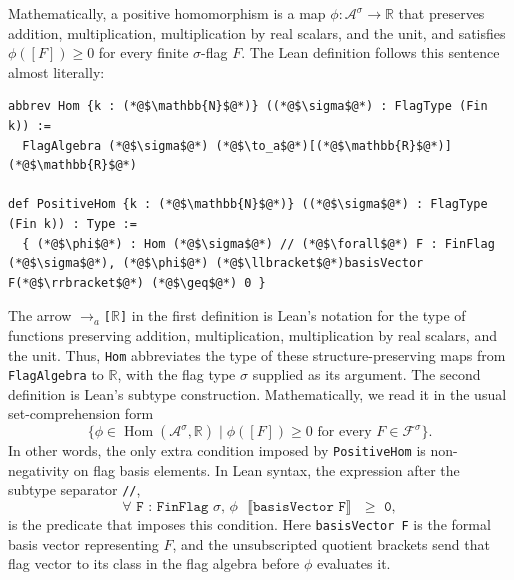 \documentclass{article}
\newcommand{\lean}[1]{\texttt{#1}}
\begin{document}
Mathematically, a positive homomorphism is a map
\(\phi:\mathcal{A}^\sigma\to\mathbb{R}\) that preserves addition,
multiplication, multiplication by real scalars, and the unit, and satisfies
\(\phi([F])\ge 0\) for every finite \(\sigma\)-flag \(F\).  The Lean definition
follows this sentence almost literally:
\begin{lstlisting}
abbrev Hom {k : (*@$\mathbb{N}$@*)} ((*@$\sigma$@*) : FlagType (Fin k)) :=
  FlagAlgebra (*@$\sigma$@*) (*@$\to_a$@*)[(*@$\mathbb{R}$@*)] (*@$\mathbb{R}$@*)

def PositiveHom {k : (*@$\mathbb{N}$@*)} ((*@$\sigma$@*) : FlagType (Fin k)) : Type :=
  { (*@$\phi$@*) : Hom (*@$\sigma$@*) // (*@$\forall$@*) F : FinFlag (*@$\sigma$@*), (*@$\phi$@*) (*@$\llbracket$@*)basisVector F(*@$\rrbracket$@*) (*@$\geq$@*) 0 }
\end{lstlisting}
The arrow \lean{$\to_a$[$\mathbb{R}$]} in the first definition is Lean's
notation for the type of functions preserving addition, multiplication,
multiplication by real scalars, and the unit.  Thus, \lean{Hom}
abbreviates the type of these structure-preserving maps from
\lean{FlagAlgebra} to \(\mathbb{R}\), with the flag type \(\sigma\) supplied as
its argument.  The second definition is Lean's subtype construction.
Mathematically, we read it in the usual set-comprehension form
\[
  \{\phi\in \operatorname{Hom}(\mathcal{A}^\sigma,\mathbb{R})
    \mid \phi([F])\ge 0
    \text{ for every }F\in\mathcal{F}^{\sigma}\}.
\]
In other words, the only extra condition imposed by \lean{PositiveHom} is
non-negativity on flag basis elements.  In Lean syntax, the expression after
the subtype separator \lean{//},
\[
  \lean{$\forall$ F : FinFlag $\sigma$, $\phi$ $\llbracket$basisVector F$\rrbracket$ $\geq$ 0},
\]
is the predicate that imposes this condition.
Here \lean{basisVector F} is the formal basis vector representing \(F\), and
the unsubscripted quotient brackets send that flag vector to its class in the flag
algebra before \(\phi\) evaluates it.
\end{document}
